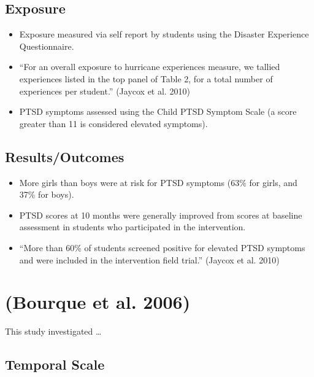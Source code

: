 \documentclass[
]{article}
\providecommand{\tightlist}{%
  \setlength{\itemsep}{0pt}\setlength{\parskip}{0pt}}
\begin{document}
\hypertarget{exposure-11}{%
\subsection{Exposure}\label{exposure-11}}

\begin{itemize}
\tightlist
\item
  Exposure measured via self report by students using the Disaster
  Experience Questionnaire.
\item
  ``For an overall exposure to hurricane experiences measure, we tallied
  experiences listed in the top panel of Table 2, for a total number of
  experiences per student.'' (Jaycox et al. 2010)
\item
  PTSD symptoms assessed using the Child PTSD Symptom Scale (a score
  greater than 11 is considered elevated symptoms).
\end{itemize}

\hypertarget{resultsoutcomes-10}{%
\subsection{Results/Outcomes}\label{resultsoutcomes-10}}

\begin{itemize}
\tightlist
\item
  More girls than boys were at risk for PTSD symptoms (63\% for girls,
  and 37\% for boys).
\item
  PTSD scores at 10 months were generally improved from scores at
  baseline assessment in students who participated in the intervention.
\item
  ``More than 60\% of students screened positive for elevated PTSD
  symptoms and were included in the intervention field trial.'' (Jaycox
  et al. 2010)
\end{itemize}

\hypertarget{bourque2006weathering}{%
\section{(Bourque et al. 2006)}\label{bourque2006weathering}}

This study investigated \ldots{}

\hypertarget{temporal-scale-13}{%
\subsection{Temporal Scale}\label{temporal-scale-13}}
\end{document}
